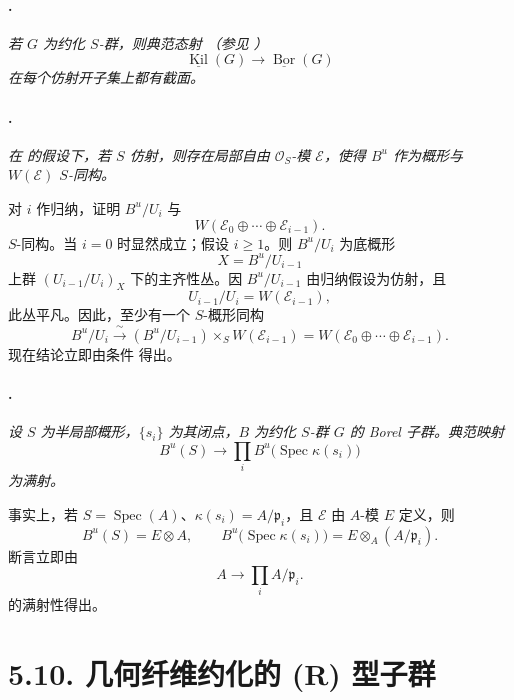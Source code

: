 \paragraph{.}
{\itshape 若 \(G\) 为约化 \(S\)-群，则典范态射 \textup{（参见 ）}
\[
  \underline{\operatorname{Kil}}(G)
  \longrightarrow
  \underline{\operatorname{Bor}}(G)
\]
在每个仿射开子集上都有截面。}

\paragraph{.}
{\itshape 在  的假设下，若 \(S\) 仿射，则存在局部自由 \(\mathcal O_S\)-模 \(\mathcal E\)，使得 \(B^u\) 作为概形与 \(W(\mathcal E)\) \(S\)-同构。}

对 \(i\) 作归纳，证明 \(B^u/U_i\) 与
\[
  W(\mathcal E_0\oplus\cdots\oplus\mathcal E_{i-1}).
\]
\(S\)-同构。当 \(i=0\) 时显然成立；假设 \(i\geq1\)。则 \(B^u/U_i\) 为底概形
\[
  X=B^u/U_{i-1}
\]
上群 \((U_{i-1}/U_i)_X\) 下的主齐性丛。因 \(B^u/U_{i-1}\) 由归纳假设为仿射，且
\[
  U_{i-1}/U_i=W(\mathcal E_{i-1}),
\]
此丛平凡。因此，至少有一个 \(S\)-概形同构
\[
  B^u/U_i
  \xrightarrow{\;\sim\;}
  (B^u/U_{i-1})\times_S W(\mathcal E_{i-1})
  =
  W(\mathcal E_0\oplus\cdots\oplus\mathcal E_{i-1}).
\]
现在结论立即由条件 \textup{} 得出。

\paragraph{.}
{\itshape 设 \(S\) 为半局部概形，\(\{s_i\}\) 为其闭点，\(B\) 为约化 \(S\)-群 \(G\) 的 Borel 子群。典范映射
\[
  B^u(S)
  \longrightarrow
  \prod_i B^u\bigl(\operatorname{Spec}\kappa(s_i)\bigr)
\]
为满射。}

事实上，若 \(S=\operatorname{Spec}(A)\)、\(\kappa(s_i)=A/\mathfrak p_i\)，且 \(\mathcal E\) 由 \(A\)-模 \(E\) 定义，则
\[
  B^u(S)=E\otimes A,
  \qquad
  B^u\bigl(\operatorname{Spec}\kappa(s_i)\bigr)
  =
  E\otimes_A(A/\mathfrak p_i).
\]
断言立即由
\[
  A\longrightarrow\prod_i A/\mathfrak p_i.
\]
的满射性得出。

\section*{5.10. 几何纤维约化的 \textup{(R)} 型子群}

